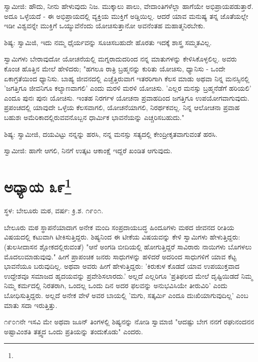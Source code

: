 ಸ್ವಾಮೀಜಿ: ಹೌದು, ನೀನು ಹೇಳುವುದು ನಿಜ. ಮುಕ್ಕಾಲು ಪಾಲು, ವೇದಾಂತಿಗಳೆಲ್ಲಾ ಹಾಗೆಯೇ ಅಭಿಪ್ರಾಯಪಡುತ್ತಾರೆ. ಅದೂ ಒಳ್ಳೆಯದೆ - ಈ ಅಭಿಪ್ರಾಯದಲ್ಲಿ ವ್ಯಕ್ತಿಯ ಮುಕ್ತಿಗೆ ಅಡ್ಡಿಯಿಲ್ಲ. ಆದರೆ ಯಾವ ಮನುಷ್ಯ ತನ್ನ ಜೊತೆಯಲ್ಲೇ ಇಡೀ ವಿಶ್ವವನ್ನೇ ಮುಕ್ತಿಗೆ ಒಯ್ಯುವೆನೆಂದು ಯೋಚಿಸುತ್ತಾನೋ ಅವನೆಂತಹ ಮಹಾತ್ಮನಿರಬೇಕು.

ಶಿಷ್ಯ: ಸ್ವಾಮಿಜಿ, ಇದು ನಮ್ಮ ಧೈರ್ಯವನ್ನು ಸೂಚಿಸಬಹುದೇ ಹೊರತು ಇದಕ್ಕೆ ಶಾಸ್ತ್ರ ಸಮ್ಮತವಿಲ್ಲ.

ಸ್ವಾಮಿಗಳು ಬೇರಾವುದೋ ಯೋಚನೆಯಲ್ಲಿ ಮಗ್ನರಾದುದರಿಂದ ನನ್ನ ಮಾತುಗಳನ್ನು ಕೇಳಿಸಿಕೊಳ್ಳಲಿಲ್ಲ. ಅವರು ಕೊಂಚ ಹೊತ್ತಿನ ಮೇಲೆ ಹೇಳಿದರು; "ಹಗಲೂ ರಾತ್ರಿ ಬ್ರಹ್ಮನನ್ನು ಕುರಿತು ಯೋಚಿಸು, ಧ್ಯಾನಿಸು - ಒಂದೇ ಏಕಾಗ್ರತೆಯಿಂದ ಧ್ಯಾನಿಸು. ಬಾಹ್ಯ ಜೀವನದಲ್ಲಿ ಎಚ್ಚೆತ್ತಿರುವಾಗ ಇತರರಿಗಾಗಿ ಕೆಲಸ ಮಾಡು ಅಥವಾ ನಿನ್ನ ಮನಸ್ಸಿನಲ್ಲಿ 'ಜಗತ್ತಿಗೂ ಜೀವನಿಗೂ ಕಲ್ಯಾಣವಾಗಲಿ' ಎಂದು ಮರಳಿ ಮರಳಿ ಯೋಚಿಸು. 'ಎಲ್ಲರ ಮನಸ್ಸು ಬ್ರಹ್ಮನೆಡೆಗೆ ಹರಿಯಲಿ' ಎಂದೂ ಪುನಃ ಪುನಃ ಯೋಚಿಸು. ಇಂತಹ ನಿರರ್ಗಳ ಯೋಚನಾ ಪ್ರವಾಹದಿಂದ ಜಗತ್ತಿಗೂ ಉಪಯೋಗವಾಗುವುದು. ಪ್ರಪಂಚದಲ್ಲಿ ಯಾವುದೇ ಒಳ್ಳೆಯ ಕೆಲಸವಾಗಲಿ, ಯೋಚನೆಯಾಗಲಿ, ನಿರರ್ಥಕವಲ್ಲ. ನಿನ್ನ ಆಲೋಚನಾ ಪ್ರವಾಹ ಬಹುಶಃ ಅಮೆರಿಕಾದಲ್ಲಿರುವವನೊಬ್ಬನ ಧಾರ್ಮಿಕ ಭಾವನೆಯನ್ನು ಎಚ್ಚರಿಸಬಹುದು."

ಶಿಷ್ಯ: ಸ್ವಾಮೀಜಿ, ದಯವಿಟ್ಟು ನನ್ನನ್ನು ಹರಸಿ, ನನ್ನ ಮನಸ್ಸು ಸತ್ಯದಲ್ಲಿ ಕೇಂದ್ರೀಕೃತವಾಗುವಂತೆ ಹರಸಿ.

ಸ್ವಾಮೀಜಿ: ಹಾಗೇ ಆಗಲಿ, ನಿನಗೆ ಉತ್ಕಟ ಆಕಾಂಕ್ಷೆ ಇದ್ದರೆ ಖಂಡಿತ ಆಗುವುದು.

\newpage

\chapter[ಅಧ್ಯಾಯ ೩೯]{ಅಧ್ಯಾಯ ೩೯\protect\footnote{}}

\begin{center}
ಸ್ಥಳ: ಬೇಲೂರು ಮಠ, ವರ್ಷ: ಕ್ರಿ.ಶ. ೧೯೦೧.
\end{center}

ಬೇಲೂರು ಮಠ ಸ್ಥಾಪನೆಯಾದಾಗ ಅನೇಕ ಮಂದಿ ಸಂಪ್ರದಾಯಬದ್ಧ ಹಿಂದೂಗಳು ಮಠದ ಜೀವನದ ರೀತಿಯ ವಿಷಯದಲ್ಲಿ ಕಟುವಾಗಿ ಟೀಕಿಸುತ್ತಿದ್ದರು. ಶಿಷ್ಯನಿಂದ ಈ ಟೀಕೆಯ ವಿಷಯವನ್ನು ಕೇಳಿ ಸ್ವಾಮಿಗಳು ಹೇಳುತ್ತಿದ್ದರು: (ತುಲಸೀದಾಸನ ಶ್ಲೋಕದಲ್ಲಿರುವಂತೆ) "ಆನೆ ಅಂಗಡಿ ಬೀದಿಯಲ್ಲಿ ಹೋಗುತ್ತಿದ್ದರೆ ಸಾವಿರಾರು ನಾಯಿಗಳು ಬೊಗಳಲು ಮೊದಲುಮಾಡುವುವು." ಹೀಗೆ ಪ್ರಾಪಂಚಿಕ ಜನರು ಸಾಧುಗಳನ್ನು ಹಳಿದರೆ ಅದರಿಂದ ಸಾಧುಗಳಿಗೆ ಯಾವ ಕೆಟ್ಟ ಭಾವನೆಯೂ ಬರುವುದಿಲ್ಲ. ಅಥವಾ ಅವರು ಹೀಗೆ ಹೇಳುತ್ತಿದ್ದರು: 'ಕಿರುಕುಳ ಕೊಡದೆ ಯಾವ ಉಪಯುಕ್ತವಾದ ಉದ್ದೇಶವೂ ಸಮಾಜದ ಹೃದಯವನ್ನು ಪ್ರವೇಶಿಸಲಾರದು.' ಅಲ್ಲದೆ ಎಲ್ಲರಿಗೂ 'ಪ್ರತಿಫಲದ ಮೇಲೆ ದೃಷ್ಟಿಯಿಡದೆ ನಿಮ್ಮ ನಿಮ್ಮ ಕರ್ಮದಲ್ಲಿ ನಿರತರಾಗಿ, ಒಂದಲ್ಲ ಒಂದು ದಿನ ಅದರ ಫಲವನ್ನು ಅನುಭವಿಸಿಯೇ ತೀರುವಿರಿ' ಎಂದು ಬೋಧಿಸುತ್ತಿದ್ದರು. ಅಲ್ಲದೆ ಅನೇಕ ವೇಳೆ ಅವರ ಬಾಯಲ್ಲಿ 'ಮಗು, ಸತ್ಕರ್ಮಿ ಎಂದೂ ದುಃಖಿಯಾಗುವುದಿಲ್ಲ' ಎಂಬ ಮಾತು ಸದಾ ಇರುತ್ತಿತ್ತು.

೧೯೦೧ನೇ ಇಸವಿ ಮೇ ಅಥವಾ ಜೂನ್ ತಿಂಗಳಲ್ಲಿ ಶಿಷ್ಯನನ್ನು ನೋಡಿ ಸ್ವಾಮಾಜಿ "ಆದಷ್ಟು ಬೇಗ ನನಗೆ ರಘುನಂದನನ ಅಷ್ಟಾವಿಂಶತಿ ತತ್ತ್ವದ ಒಂದು ಪ್ರತಿಯನ್ನು ತಂದುಕೊಡು" ಎಂದರು.


